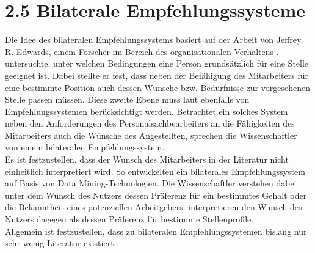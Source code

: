 \section[Bilaterale Empfehlungssysteme]{2.5 Bilaterale Empfehlungssysteme}
\label{ch:standDerForschung:bilateraleVerfahren}
Die Idee des bilateralen Empfehlungssystems basiert auf der Arbeit von Jeffrey R. Edwards, einem Forscher im Bereich des organisationalen Verhaltens \cite[S. 3]{malinowski:2006}. \textcite[S. 2ff.]{edwards:1991} untersuchte, unter welchen Bedingungen eine Person grundsätzlich für eine Stelle geeignet ist. Dabei stellte er fest, dass neben der Befähigung des Mitarbeiters für eine bestimmte Position auch dessen Wünsche bzw. Bedürfnisse zur vorgesehenen Stelle passen müssen. Diese zweite Ebene muss laut \textcite[S. 1]{malinowski:2006} ebenfalls von Empfehlungssystemen berücksichtigt werden. Betrachtet ein solches System neben den Anforderungen des Personalsachbearbeiters an die Fähigkeiten des Mitarbeiters auch die Wünsche des Angestellten, sprechen die Wissenschaftler von einem bilateralen Empfehlungssystem.\\
Es ist festzustellen, dass der Wunsch des Mitarbeiters in der Literatur nicht einheitlich interpretiert wird. So entwickelten \textcite[S. 1ff.]{applyingDataMining:2014} ein bilaterales Empfehlungssystem auf Basis von Data Mining-Technologien. Die Wissenschaftler verstehen dabei unter dem Wunsch des Nutzers dessen Präferenz für ein bestimmtes Gehalt oder die Bekanntheit eines potenziellen Arbeitgebers. \textcite[S. 4ff.]{malinowski:2006} interpretieren den Wunsch des Nutzers dagegen als dessen Präferenz für bestimmte Stellenprofile.\\
Allgemein ist festzustellen, dass zu bilateralen Empfehlungssystemen bislang nur sehr wenig Literatur existiert \cite[S. 2f.]{jobRecommenderSystemsASurvey:2012}.\\

